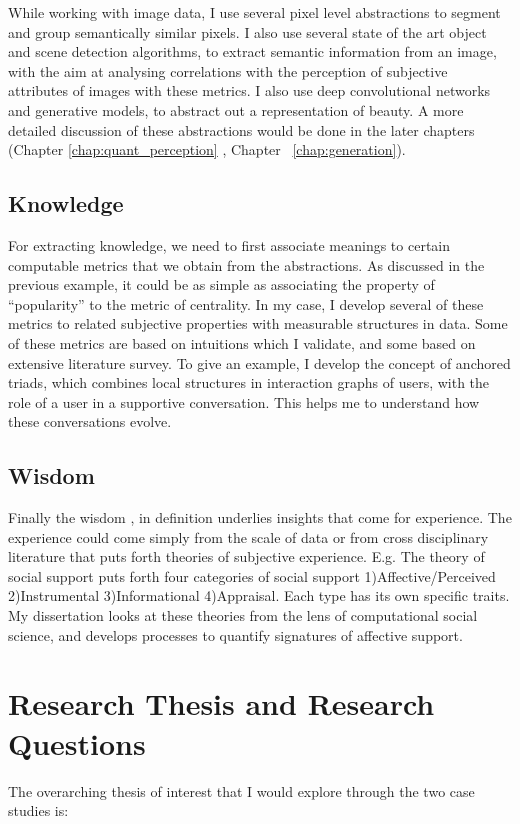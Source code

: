 While working with image data, I use several pixel level abstractions to segment and group semantically similar pixels. I also use several state of the art object and scene detection algorithms, to extract semantic information from an image, with the aim at analysing correlations with the perception of subjective attributes of images with these metrics. I also use deep convolutional networks and generative models, to abstract out a representation of beauty. A more detailed discussion of these abstractions would be done in the later chapters (Chapter \ref{chap:quant_perception} , Chapter ~\ref{chap:generation}).  

\subsection{Knowledge}
For extracting knowledge, we need to first associate meanings to certain computable metrics that we obtain from the abstractions. As discussed in the previous example, it could be as simple as associating the property of ``popularity'' to the metric of centrality. In my case, I develop several of these metrics to related subjective properties with measurable structures in data. Some of these metrics are based on intuitions which I validate, and some based on extensive literature survey. To give an example, I develop the concept of anchored triads, which combines local structures in interaction graphs of users, with the role of a user in a supportive conversation. This helps me to understand how these conversations evolve.

\subsection{Wisdom}
Finally the wisdom , in definition underlies insights that come for experience. The experience could come simply from the scale of data or from cross disciplinary literature that puts forth theories of subjective experience. E.g. The theory of social support puts forth four categories of social support 1)Affective/Perceived 2)Instrumental 3)Informational 4)Appraisal. Each type has its own specific traits. My dissertation looks at these theories from the lens of computational social science, and develops processes to quantify signatures of affective support.

\section{Research Thesis and Research Questions}
The overarching thesis of interest that I would explore through the two case studies is:

